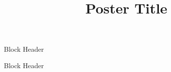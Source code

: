 \documentclass{tugPoster}
\title{Poster Title}
\begin{document}
	\maketitle

	\begin{IPTtwocol}

		\begin{IPTblock}{Block Header}
			\lipsum[1]
		\end{IPTblock}

	\IPTcolbreak

		\begin{IPTblock}{Block Header}
			\lipsum[2]
		\end{IPTblock}

	\end{IPTtwocol}
\end{document}
